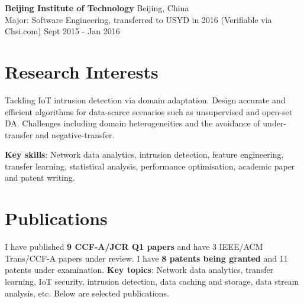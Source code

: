 \documentclass[letterpaper,10.9pt]{article}
\begin{document}
\vspace{8pt}

\textbf{Beijing Institute of Technology} \hfill Beijing, China\\
Major: Software Engineering, transferred to USYD in 2016 (Verifiable via Chsi.com) \hfill Sept 2015 - Jan 2016\\




\section{\textbf{Research Interests}}

Tackling IoT intrusion detection via domain adaptation. Design accurate and efficient algorithms for data-scarce scenarios such as unsupervised and open-set DA. Challenges including domain heterogeneities and the avoidance of under-transfer and negative-transfer. 

\textbf{Key skills}: Network data analytics, intrusion detection, feature engineering, transfer learning, statistical analysis, performance optimisation, academic paper and patent writing. 




\section{\textbf{Publications}}

I have published \textbf{9 CCF-A/JCR Q1 papers} and have 3 IEEE/ACM Trans/CCF-A papers under review. I have \textbf{8 patents being granted} and 11 patents under examination. \textbf{Key topics}: Network data analytics, transfer learning, IoT security, intrusion detection, data caching and storage, data stream analysis, etc. Below are selected publications. 
\end{document}
